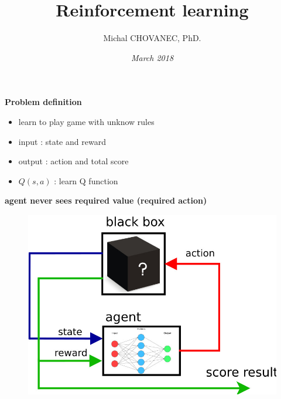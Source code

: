 \documentclass[xcolor=dvipsnames]{beamer}
\title{\bf Reinforcement learning}
\author{Michal CHOVANEC, PhD.}
\date[EURP]{\it March 2018}
\begin{document}
\begin{frame}
\titlepage
{}
\end{frame}


\begin{frame}{\bf Problem definition}
\begin{itemize}
 \item learn to play game with unknow rules
 \item input  : state and reward
 \item output : action and total score
 \item $Q(s, a)$ : learn Q function
\end{itemize}
\centering

{\color{red} \bf agent never sees required value (required action)}


\begin{figure}
\centering
\begin{minipage}{.5\textwidth}
  \centering
  \includegraphics[scale=0.2]{../../diagrams/rl_mechanism.jpg}
\end{minipage}%
\begin{minipage}{.5\textwidth}
  \centering

\end{minipage}
\end{figure}
\end{frame}
\end{document}
